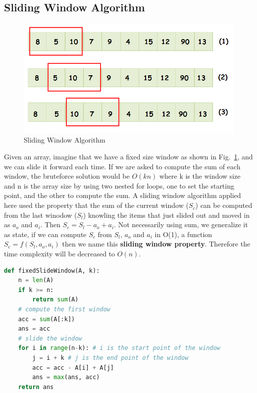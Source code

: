 \documentclass[../searching.tex]{subfiles}
\begin{document}

\subsection{Sliding Window Algorithm}
\begin{figure}[h!]
    \centering
    \includegraphics[width=0.7\columnwidth]{fig/sliding1.png}
    \caption{Sliding Window Algorithm}
    \label{fig:slide_window}
\end{figure}
Given an array, imagine that we have a fixed size window as shown in Fig.~\ref{fig:slide_window}, and we can slide it forward each time. If we are asked to compute the sum of each window, the bruteforce solution would be $O(kn)$ where k is the window size and n is the array size by using two nested for loops, one to set the starting point, and the other to compute the sum. A sliding window algorithm applied here used the property that the sum of the current window ($S_c$) can be computed from the last winodow ($S_l$) knowling the items that just slided out and moved in as $a_o$ and $a_i$. Then $S_c = S_l-a_o+a_i$. Not necessarily using sum, we generalize it as state, if we can compute $S_c$ from $S_l$, $a_o$ and $a_i$ in O(1), a function $S_c = f(S_l, a_o, a_i)$ then we name this \textbf{sliding window property}. Therefore the time complexity will be decreased to $O(n)$. 
\begin{lstlisting}[language=Python]
def fixedSlideWindow(A, k):
    n = len(A)
    if k >= n:
        return sum(A)
    # compute the first window
    acc = sum(A[:k])
    ans = acc
    # slide the window
    for i in range(n-k): # i is the start point of the window
        j = i + k # j is the end point of the window
        acc = acc - A[i] + A[j]
        ans = max(ans, acc)
    return ans
\end{lstlisting}
\end{document}
